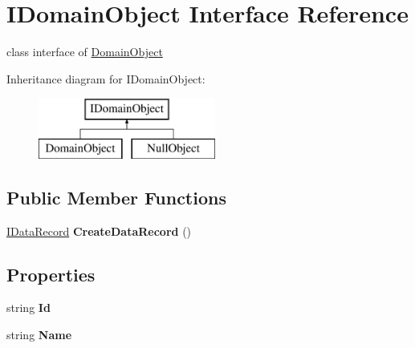 \hypertarget{interface_i_domain_object}{\section{I\-Domain\-Object Interface Reference}
\label{interface_i_domain_object}
}


class interface of \hyperlink{class_domain_object}{Domain\-Object}  


Inheritance diagram for I\-Domain\-Object\-:\begin{figure}[H]
\begin{center}
\leavevmode
\includegraphics[height=2.000000cm]{interface_i_domain_object}
\end{center}
\end{figure}
\subsection*{Public Member Functions}
\begin{DoxyCompactItemize}
\item 
\hypertarget{interface_i_domain_object_acc9b6dc8f95dbfbb23fb152371ced472}{\hyperlink{interface_i_data_record}{I\-Data\-Record} {\bfseries Create\-Data\-Record} ()}\label{interface_i_domain_object_acc9b6dc8f95dbfbb23fb152371ced472}

\end{DoxyCompactItemize}
\subsection*{Properties}
\begin{DoxyCompactItemize}
\item 
\hypertarget{interface_i_domain_object_aee7b3c3e492a8faab64eda83cdb54841}{string {\bfseries Id}}\label{interface_i_domain_object_aee7b3c3e492a8faab64eda83cdb54841}

\item 
\hypertarget{interface_i_domain_object_a2aa8f720dd778edd86bac7f4b09514d5}{string {\bfseries Name}}\label{interface_i_domain_object_a2aa8f720dd778edd86bac7f4b09514d5}

\end{DoxyCompactItemize}


